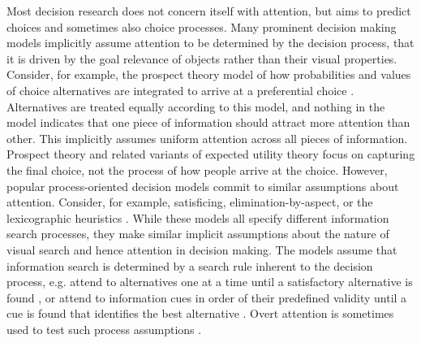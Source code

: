 Most decision research does not concern itself with attention, but aims to predict choices and sometimes also choice processes. Many prominent decision making models implicitly assume attention to be determined by the decision process, that it is driven by the goal relevance of objects rather than their visual properties. Consider, for example, the prospect theory model of how probabilities and values of choice alternatives are integrated to arrive at a preferential choice \citep{tversky1979}. Alternatives are treated equally according to this model, and nothing in the model indicates that one piece of information should attract more attention than other. This implicitly assumes uniform attention across all pieces of information. Prospect theory and related variants of expected utility theory focus on capturing the final choice, not the process of how people arrive at the choice. However, popular process-oriented decision models commit to similar assumptions about attention. Consider, for example, satisficing, elimination-by-aspect, or the lexicographic heuristics \citep{payne1988, simon1956a}. While these models all specify different information search processes, they make similar implicit assumptions about the nature of visual search and hence attention in decision making. The models assume that information search is determined by a search rule inherent to the decision process, e.g. attend to alternatives one at a time until a satisfactory alternative is found \citep{stuttgen2012}, or attend to information cues in order of their predefined validity until a cue is found that identifies the best alternative \citep{krefeld-schwalb2019a}. Overt attention is sometimes used to test such process assumptions \citep{gloeckner2011a}.\\ 

